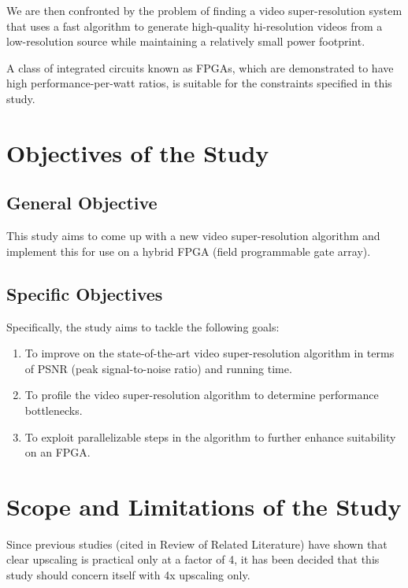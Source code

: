 We are then confronted by the problem of finding a video super-resolution system that uses a fast algorithm to generate high-quality hi-resolution videos from a low-resolution source while maintaining a relatively small power footprint.

A class of integrated circuits known as FPGAs, which are demonstrated to have high performance-per-watt ratios, is suitable for the constraints specified in this study.

\section{Objectives of the Study}

\subsection{General Objective}

This study aims to come up with a new video super-resolution algorithm and implement this for use on a hybrid FPGA (field programmable gate array).


\subsection{Specific Objectives}

Specifically, the study aims to tackle the following goals:

\begin{enumerate}
	\item To improve on the state-of-the-art video super-resolution algorithm in terms of PSNR (peak signal-to-noise ratio) and running time. 
	\item To profile the video super-resolution algorithm to determine performance bottlenecks.
	\item To exploit parallelizable steps in the algorithm to further enhance suitability on an FPGA.
\end{enumerate}


\section{Scope and Limitations of the Study}

Since previous studies (cited in Review of Related Literature) have shown that clear upscaling is practical only at a factor of 4, it has been decided that this study should concern itself with 4x upscaling only.


